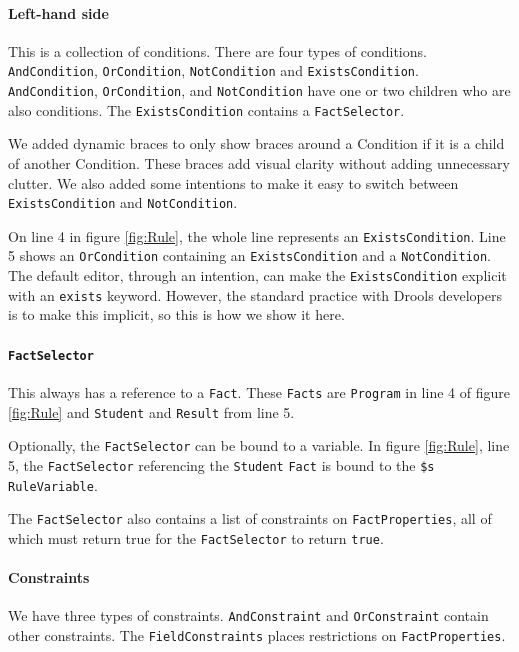 \paragraph{Left-hand side} This is a collection of conditions.
There are four types of conditions.
\texttt{AndCondition}, \linebreak\texttt{OrCondition}, \texttt{NotCondition} and \texttt{ExistsCondition}.
\texttt{AndCondition}, \texttt{OrCondition}, and \texttt{NotCondition} have one or two children who are also conditions.
The \texttt{ExistsCondition} contains a \texttt{FactSelector}.

We added dynamic braces to only show braces around a Condition if it is a child of another Condition.
These braces add visual clarity without adding unnecessary clutter.
We also added some intentions to make it easy to switch between \texttt{ExistsCondition} and \texttt{NotCondition}.

On line 4 in figure \ref{fig:Rule}, the whole line represents an \texttt{ExistsCondition}.
Line 5 shows an \texttt{OrCondition} containing an \texttt{ExistsCondition} and a \texttt{NotCondition}.
The default editor, through an intention, can make the \linebreak\texttt{ExistsCondition} explicit with an \texttt{exists} keyword.
However, the standard practice with Drools developers is to make this implicit, so this is how we show it here.

\paragraph{\texttt{FactSelector}} This always has a reference to a \texttt{Fact}.
These \texttt{Facts} are \texttt{Program} in line 4 of figure \ref{fig:Rule} and \texttt{Student} and \texttt{Result} from line 5.

Optionally, the \texttt{FactSelector} can be bound to a variable.
In figure \ref{fig:Rule}, line 5, the \texttt{FactSelector} referencing the \texttt{Student} \texttt{Fact} is bound to the \texttt{\$s} \texttt{RuleVariable}.

The \texttt{FactSelector} also contains a list of constraints on \texttt{FactProperties}, all of which must return true for the \texttt{FactSelector} to return \texttt{true}.

\paragraph{Constraints} We have three types of constraints.
\texttt{AndConstraint} and \texttt{OrConstraint} contain other constraints.
The \texttt{FieldConstraints} places restrictions on \texttt{FactProperties}.

